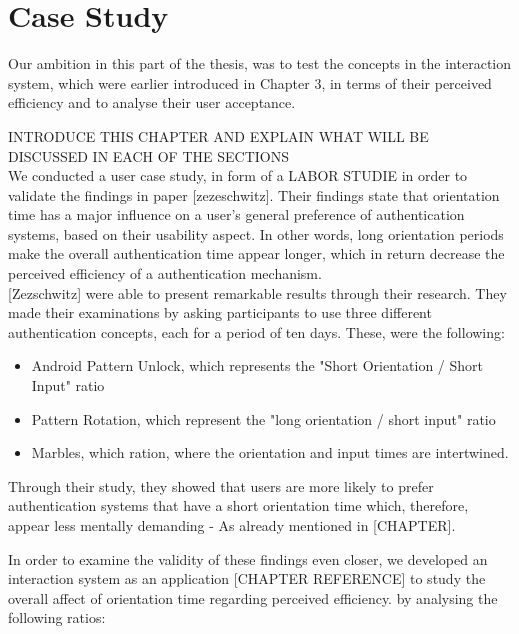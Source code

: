 
\chapter{Case Study}\label{ch:fifth}

Our ambition in this part of the thesis, was to test the concepts in the interaction system, which were earlier introduced in Chapter 3, in terms of their perceived efficiency and to analyse their user acceptance.



INTRODUCE THIS CHAPTER AND EXPLAIN WHAT WILL BE DISCUSSED IN EACH OF THE SECTIONS \\

We conducted a user case study, in form of a LABOR STUDIE in order to validate the findings in paper [zezeschwitz]. Their findings state that orientation time has a major influence on a user's general preference of authentication systems, based on their usability aspect. In other words, long orientation periods make the overall authentication time appear longer, which in return decrease the perceived efficiency of a authentication mechanism.\\

[Zezschwitz] were able to present remarkable results through their research. They made their examinations by asking participants to use three different authentication concepts, each for a period of ten days. These, were the following: 

\begin{itemize}
    \item Android Pattern Unlock, which represents the "Short Orientation / Short Input" ratio
    \item Pattern Rotation, which represent the "long orientation / short input" ratio
    \item Marbles, which ration, where the orientation and input times are intertwined.
\end{itemize}

Through their study, they showed that users are more likely to prefer authentication systems that have a short orientation time which, therefore, appear less mentally demanding - As already mentioned in [CHAPTER].\par
In order to examine the validity of these findings even closer, we developed an interaction system as an application [CHAPTER REFERENCE] to study the overall affect of orientation time regarding perceived efficiency.  by analysing the following ratios: 

